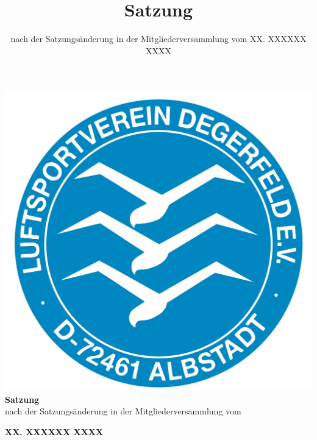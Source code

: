 \documentclass[10pt,a4paper,parskip=half]{scrartcl}
\title{Satzung}
\subtitle{nach der Satzungsänderung in der Mitgliederversammlung vom XX. XXXXXX XXXX}
\begin{document}
\thispagestyle{plain}
\begin{center}
  \includegraphics[scale=0.2]{Logo.png}\\[5ex]
  
  \Huge{\textbf{Satzung}}\\[1.5ex]
  \large{nach der Satzungsänderung in der Mitgliederversammlung vom}\\[1.5ex]
  
  \normalsize
  
  \textbf{\Large{XX. XXXXXX XXXX}}\\
  
\end{center}
\end{document}
